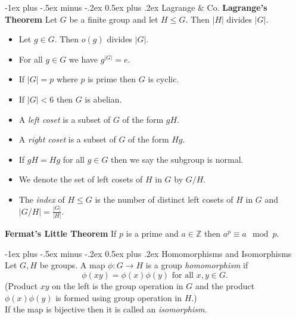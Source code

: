 \documentclass[10pt,landscape]{article}
\makeatletter
\renewcommand{\section}{\@startsection{section}{1}{0mm}%
                                {-1ex plus -.5ex minus -.2ex}%
                                {0.5ex plus .2ex}%
                                {\normalfont\large\bfseries}}
\makeatother
\begin{document}
\begin{multicols}{3}
\section{Lagrange \& Co.}
\textbf{Lagrange's Theorem} Let $G$ be a finite group and let $H \leq G$. Then $|H|$ divides $|G|$.
\begin{itemize}
	\item Let $g \in G$. Then $o(g)$ divides $|G|$.
	\item For all $g \in G$ we have $g^{|G|}=e$.
	\item If $|G| = p $ where $p$ is prime then $G$ is cyclic.
	\item If $|G| < 6$ then $G$ is abelian.
	\item A \emph{left coset} is a subset of $G$ of the form $gH$.
	\item A \emph{right coset} is a subset of $G$ of the form $Hg$.
	\item If $gH=Hg$ for all $g \in G$ then we say the subgroup is normal.
	\item We denote the set of left cosets of $H$ in $G$ by $G/H$.
	\item The \emph{index} of $H \leq G$ is the number of distinct left cosets of $H$ in $G$ and $|G/H| = \frac{|G|}{|H|}.$
\end{itemize}

\textbf{Fermat's Little Theorem} If $p$ is a prime and $a \in \mathbb{Z}$ then $a^p \equiv a \mod p$.

\section{Homomorphisms and Isomorphisms}
Let $G,H$ be groups. A map $ \phi : G \rightarrow H $ is a group \emph{homomorphism} if $$ \phi(xy)=\phi(x)\phi(y) \text{ for all } x,y \in G.$$
(Product $xy$ on the left is the group operation in $G$ and the product $\phi(x)\phi(y) $ is formed using group operation in $H$.)\\
If the map is bijective then it is called an \emph{isomorphism}.


\end{multicols}
\end{document}
